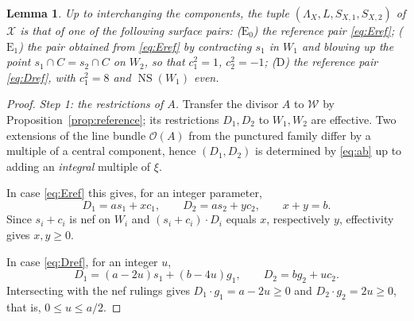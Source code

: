 \documentclass[11pt]{article}
\newcommand{\NS}{\operatorname{NS}}
\newcommand{\calX}{\mathcal X}
\newcommand{\calW}{\mathcal W}
\newtheorem{lemma}[theorem]{Lemma}
\theoremstyle{definition}
\theoremstyle{remark}
\begin{document}
\begin{lemma}\label{lem:models}
Up to interchanging the components, the tuple
\((\Lambda_X,L,S_{X,1},S_{X,2})\) of \(\calX\) is that of one of the
following surface pairs:
(\(\mathrm E_0\)) the reference pair \eqref{eq:Eref};
(\(\mathrm E_1\)) the pair obtained from \eqref{eq:Eref} by
contracting \(s_1\) in \(W_1\) and blowing up the point
\(s_1\cap C=s_2\cap C\) on \(W_2\), so that \(c_1^2=1\), \(c_2^2=-1\);
(\(\mathrm D\)) the reference pair \eqref{eq:Dref}, with
\(c_1^2=8\) and \(\NS(W_1)\) even.
\end{lemma}

\begin{proof}
\emph{Step 1: the restrictions of \(A\).}
Transfer the divisor \(A\) to \(\calW\) by
Proposition~\ref{prop:reference}; its restrictions \(D_1,D_2\) to
\(W_1,W_2\) are effective. Two extensions of the line bundle
\(\mathcal O(A)\) from the punctured family differ by a multiple of a
central component, hence \((D_1,D_2)\) is determined by \eqref{eq:ab} up to
adding an \emph{integral} multiple of \(\xi\).

In case \eqref{eq:Eref} this gives, for an integer parameter,
\begin{equation}\label{eq:ED}
 D_1=as_1+xc_1,\qquad D_2=as_2+yc_2,\qquad x+y=b .
\end{equation}
Since \(s_i+c_i\) is nef on \(W_i\) and \((s_i+c_i)\cdot D_i\) equals
\(x\), respectively \(y\), effectivity gives \(x,y\geq0\).

In case \eqref{eq:Dref}, for an integer \(u\),
\begin{equation}\label{eq:DD}
 D_1=(a-2u)s_1+(b-4u)g_1,\qquad D_2=bg_2+uc_2 .
\end{equation}
Intersecting with the nef rulings gives \(D_1\cdot g_1=a-2u\geq0\) and
\(D_2\cdot g_2=2u\geq0\), that is, \(0\leq u\leq a/2\).


\end{proof}
\end{document}
